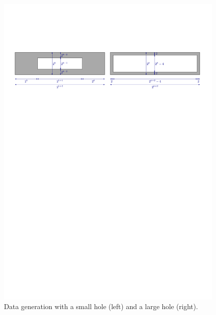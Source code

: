 \documentclass[a4paper,USenglish]{lipics}
\begin{document}
\begin{figure}
	\includegraphics[width=\textwidth,page=1]{data_generation}
	\caption{Data generation with a small hole (left) and a large hole (right).}
	\label{fig:data_generation1}
\end{figure}
\end{document}

